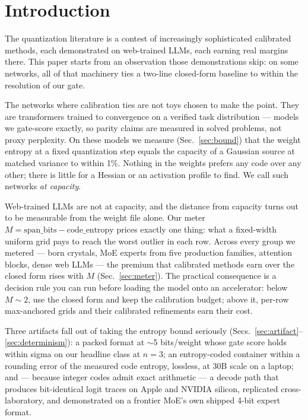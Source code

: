 \documentclass[11pt]{article}
\begin{document}
\section{Introduction}

The quantization literature is a contest of increasingly sophisticated
calibrated methods, each demonstrated on web-trained LLMs, each earning real
margins there. This paper starts from an observation those demonstrations skip:
on some networks, all of that machinery ties a two-line closed-form baseline to
within the resolution of our gate.

The networks where calibration ties are not toys chosen to make the point. They
are transformers trained to convergence on a verified task distribution ---
models we gate-score exactly, so parity claims are measured in solved problems,
not proxy perplexity. On these models we measure (Sec.~\ref{sec:bound}) that the
weight entropy at a fixed quantization step equals the capacity of a Gaussian
source at matched variance to within 1\%. %
Nothing in the weights prefers any code over any other; there is little for a
Hessian or an activation profile to find. We call such networks
\emph{at capacity}.

Web-trained LLMs are not at capacity, and the distance from capacity turns out
to be measurable from the weight file alone. Our meter
$M = \text{span\_bits} - \text{code\_entropy}$ prices exactly one thing: what a
fixed-width uniform grid pays to reach the worst outlier in each row.
Across every group we metered --- born crystals, MoE experts from five
production families, attention blocks, dense web LLMs --- the premium that
calibrated methods earn over the closed form rises with $M$
(Sec.~\ref{sec:meter}). The practical consequence is a decision rule you can run
before loading the model onto an accelerator: below $M \sim 2$, use the closed
form and keep the calibration budget; above it, per-row max-anchored grids and
their calibrated refinements earn their cost. %

Three artifacts fall out of taking the entropy bound seriously
(Secs.~\ref{sec:artifact}--\ref{sec:determinism}): a packed format at
$\sim$5 bits/weight whose gate score holds within sigma on our headline class at
$n{=}3$; an entropy-coded container within a rounding error of the measured code
entropy, lossless, at 30B scale on a laptop; and --- because integer codes admit
exact arithmetic --- a decode path that produces bit-identical logit traces on
Apple and NVIDIA silicon, replicated cross-laboratory, and demonstrated on a
frontier MoE's own shipped 4-bit expert format.
\end{document}
